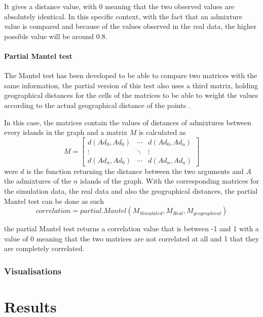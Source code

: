 \documentclass[a4paper,12pt]{report}
\begin{document}
It gives a distance value, with 0 meaning that the two observed values are absolutely identical. In this specific context, with the fact that an admixture value is compared and because of the values observed in the real data, the higher possible value will be around $0.8$.


\subsubsection{Partial Mantel test}
The Mantel test has been developed to be able to compare two matrices with the same information, the partial version of this test also uses a third matrix, holding geographical distances for the cells of the matrices to be able to weight the values according to the actual geographical distance of the points \cite{Smo01}.

In this case, the matrices contain the values of distances of admixtures between every islands in the graph and a matrix $M$ is calculated as
\begin{equation}
	M = \begin{bmatrix}
		d(Ad_0, Ad_0)	& \cdots & d(Ad_0, Ad_n) \\
		\vdots			& \ddots & \vdots		 \\
		d(Ad_n, Ad_0)	& \cdots & d(Ad_n, Ad_n)
	\end{bmatrix}
\end{equation}
were $d$ is the function returning the distance between the two arguments and $A$ the admixtures of the $n$ islands of the graph. With the corresponding matrices for the simulation data, the real data and also the geographical distances, the partial Mantel test can be done as such
\begin{equation}
	correlation = partial.Mantel(M_{Simulated}, M_{Real}, M_{geographical})
\end{equation}

the partial Mantel test returns a correlation value that is between -1 and 1 with a value of 0 meaning that the two matrices are not correlated at all and 1 that they are completely correlated.

\subsection{Visualisations}




\chapter{Results}
\end{document}
